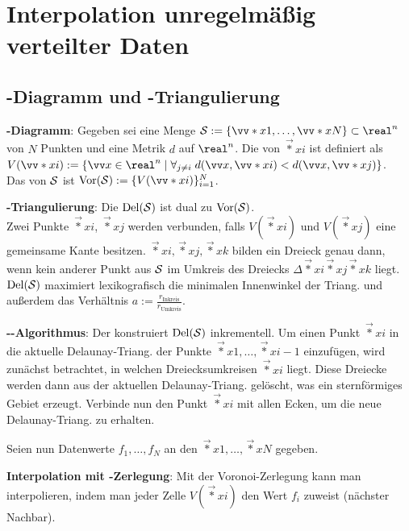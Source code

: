 \chapter{%
    Interpolation unregelmäßig verteilter Daten%
}

\section{%
    -Diagramm und -Triangulierung%
}

\textbf{-Diagramm}:
Gegeben sei eine Menge $\S := \{\vec*{x}{1}, \dotsc, \vec*{x}{N}\} \subset \real^n$ von
$N$ Punkten und eine Metrik $d$ auf $\real^n$.
Die  von $\vec*{x}{i}$ ist definiert als\\
$V(\vec*{x}{i}) := \{\vec{x} \in \real^n \;|\;
\forall_{j\not=i}\; d(\vec{x}, \vec*{x}{i}) < d(\vec{x}, \vec*{x}{j})\}$.\\
Das  von $\S$ ist $\Vor(\S) := \{V(\vec*{x}{i})\}_{i=1}^N$.

\textbf{-Triangulierung}:
Die  $\Del(\S)$ ist dual zu $\Vor(\S)$.\\
Zwei Punkte $\vec*{x}{i}$, $\vec*{x}{j}$ werden verbunden, falls
$V(\vec*{x}{i})$ und $V(\vec*{x}{j})$ eine gemeinsame Kante besitzen.
$\vec*{x}{i}, \vec*{x}{j}, \vec*{x}{k}$ bilden ein Dreieck genau dann, wenn
kein anderer Punkt aus $\S$ im Umkreis des Dreiecks
$\Delta\vec*{x}{i}\vec*{x}{j}\vec*{x}{k}$ liegt.
$\Del(\S)$ maximiert lexikografisch die minimalen Innenwinkel der Triang. und außerdem
das Verhältnis $a := \frac{r_\text{Inkreis}}{r_\text{Umkreis}}$.

\textbf{--Algorithmus}:
Der  konstruiert $\Del(\S)$ inkrementell.
Um einen Punkt $\vec*{x}{i}$ in die aktuelle Delaunay-Triang. der Punkte
$\vec*{x}{1}, \dotsc, \vec*{x}{i-1}$ einzufügen,
wird zunächst betrachtet, in welchen Dreiecksumkreisen $\vec*{x}{i}$ liegt.
Diese Dreiecke werden dann aus der aktuellen Delaunay-Triang. gelöscht,
was ein sternförmiges Gebiet erzeugt.
Verbinde nun den Punkt $\vec*{x}{i}$ mit allen Ecken, um die neue Delaunay-Triang. zu erhalten.

\linie

Seien nun Datenwerte $f_1, \dotsc, f_N$ an den $\vec*{x}{1}, \dotsc, \vec*{x}{N}$ gegeben.

\textbf{Interpolation mit -Zerlegung}:
Mit der Voronoi-Zerlegung kann man interpolieren,
indem man jeder Zelle $V(\vec*{x}{i})$ den Wert $f_i$ zuweist
(nächster Nachbar).

